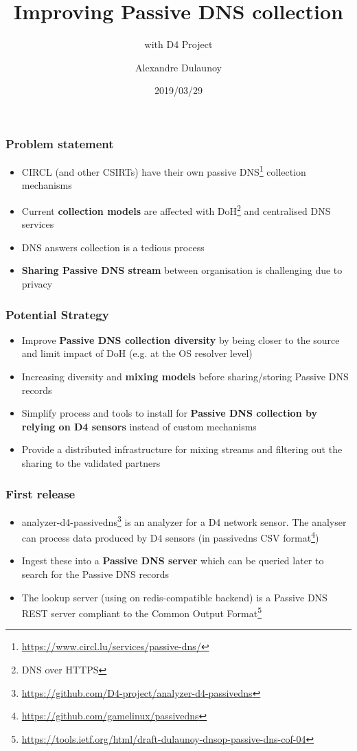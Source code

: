 \documentclass{beamer}
\title{Improving Passive DNS collection}
\subtitle{with D4 Project}
\author{Alexandre Dulaunoy}
\institute{Team CIRCL \\ \url{https://www.d4-project.org/}}
\date{2019/03/29}
\begin{document}
    \begin{frame}
        \maketitle
    \end{frame}

\begin{frame}
        \frametitle{Problem statement}
        \begin{itemize}
                \item CIRCL (and other CSIRTs) have their own passive DNS\footnote{\url{https://www.circl.lu/services/passive-dns/}} collection mechanisms
                \item Current {\bf collection models} are affected with DoH\footnote{DNS over HTTPS} and centralised DNS services
                \item DNS answers collection is a tedious process
                \item {\bf Sharing Passive DNS stream} between organisation is challenging due to privacy
        \end{itemize}
\end{frame}


\begin{frame}
        \frametitle{Potential Strategy}
 \begin{itemize}
         \item Improve {\bf Passive DNS collection diversity} by being closer to the source and limit impact of DoH (e.g. at the OS resolver level)
         \item Increasing diversity and {\bf mixing models} before sharing/storing Passive DNS records
         \item Simplify process and tools to install for {\bf Passive DNS collection by relying on D4 sensors} instead of custom mechanisms
         \item Provide a distributed infrastructure for mixing streams and filtering out the sharing to the validated partners
 \end{itemize}
\end{frame}

\begin{frame}
        \frametitle{First release}
 \begin{itemize}

         \item analyzer-d4-passivedns\footnote{\url{https://github.com/D4-project/analyzer-d4-passivedns}} is an analyzer for a D4 network sensor. The analyser can process data produced by D4 sensors (in passivedns CSV format\footnote{\url{https://github.com/gamelinux/passivedns}})
         \item Ingest these into a {\bf Passive DNS server} which can be queried later to search for the Passive DNS records
\item The lookup server (using on redis-compatible backend) is a Passive DNS REST server compliant to the Common Output Format\footnote{\url{https://tools.ietf.org/html/draft-dulaunoy-dnsop-passive-dns-cof-04}}
\end{itemize}
\end{frame}
\end{document}
